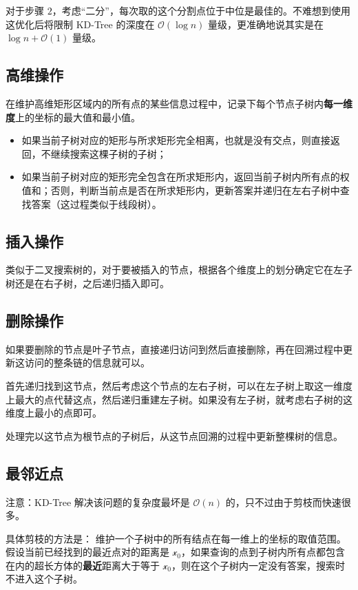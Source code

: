 对于步骤 $2$，考虑“二分”，每次取的这个分割点位于中位是最佳的。不难想到使用这优化后将限制 KD-Tree 的深度在 $\mathcal O\left(\log n\right)$ 量级，更准确地说其实是在 $\log n + \mathcal O(1)$ 量级。

\subsection{高维操作}

在维护高维矩形区域内的所有点的某些信息过程中，记录下每个节点子树内\textbf{每一维度}上的坐标的最大值和最小值。

\begin{itemize}
\item 如果当前子树对应的矩形与所求矩形完全相离，也就是没有交点，则直接返回，不继续搜索这棵子树的子树；

\item 如果当前子树对应的矩形完全包含在所求矩形内，返回当前子树内所有点的权值和；否则，判断当前点是否在所求矩形内，更新答案并递归在左右子树中查找答案（这过程类似于线段树）。
\end{itemize}

\subsection{插入操作}

类似于二叉搜索树的，对于要被插入的节点，根据各个维度上的划分确定它在左子树还是在右子树，之后递归插入即可。

\subsection{删除操作}
如果要删除的节点是叶子节点，直接递归访问到然后直接删除，再在回溯过程中更新这访问的整条链的信息就可以。

首先递归找到这节点，然后考虑这个节点的左右子树，可以在左子树上取这一维度上最大的点代替这点，然后递归重建左子树。如果没有左子树，就考虑右子树的这维度上最小的点即可。

处理完以这节点为根节点的子树后，从这节点回溯的过程中更新整棵树的信息。


\subsection{最邻近点}
注意：KD-Tree 解决该问题的复杂度最坏是 $\mathcal O(n)$ 的，只不过由于剪枝而快速很多。

具体剪枝的方法是：
维护一个子树中的所有结点在每一维上的坐标的取值范围。假设当前已经找到的最近点对的距离是 $\mathscr x_0$，如果查询的点到子树内所有点都包含在内的超长方体的\textbf{最近}距离大于等于 $\mathscr x_0$，则在这个子树内一定没有答案，搜索时不进入这个子树。